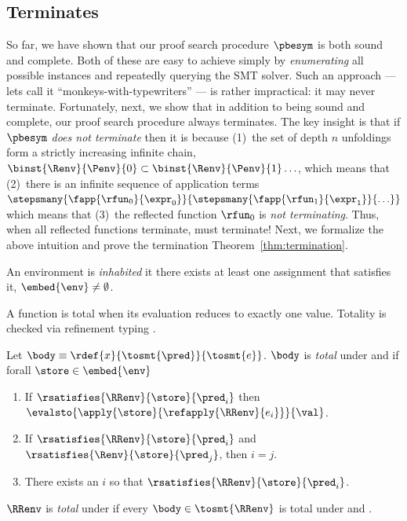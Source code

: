 \subsection{\pbesym Terminates} \label{sec:pbe:termination}

So far, we have shown that our proof search
procedure $\pbesym$ is both sound and complete.
%
Both of these are easy to achieve
simply by \emph{enumerating} all possible
instances and repeatedly querying the SMT
solver.
%
Such an approach --- lets call it
``monkeys-with-typewriters'' --- is rather
impractical: it may never terminate.
%
Fortunately, next, we show that in addition
to being sound and complete, our proof search
procedure always terminates.
%
The key insight is that if $\pbesym$ \emph{does not terminate}
then it is because
%
(1)~the set of depth $n$ unfoldings form a strictly
    increasing infinite chain,
    $\binst{\Renv}{\Penv}{0} \subset \binst{\Renv}{\Penv}{1} \ldots$,
    which means that
(2)~there is an infinite sequence of application terms
    $\stepsmany{\fapp{\rfun_0}{\expr_0}}{\stepsmany{\fapp{\rfun_1}{\expr_1}}{\ldots}}$
    which means that
(3)~the reflected function $\rfun_0$ is \emph{not terminating}.
%
Thus, when all reflected functions terminate, \pbesym must terminate!
%
Next, we formalize the above intuition and
prove the termination Theorem~\ref{thm:termination}.


%
An environment \env is \emph{inhabited} 
it there exists at least one assignment 
that satisfies it, \ie $\embed{\env} \not = \emptyset$.



%
A function is total when its evaluation 
reduces to exactly one value.
%
Totality is checked via
refinement typing \cite{Vazou14}.
%

\begin{definition}\label{asm:total}
Let $\body \equiv \rdef{x}{\tosmt{\pred}}{\tosmt{e}}$.
%
$\body$ is \emph{total} under \env and \RRenv if forall $\store\in \embed{\env}$
%
\begin{enumerate}
\item If $\rsatisfies{\RRenv}{\store}{\pred_i}$ then 
$\evalsto{{\apply{\store}{\refapply{\RRenv}{e_i}}}}{\val}$.
\item If $\rsatisfies{\RRenv}{\store}{\pred_i}$ and $\rsatisfies{\Renv}{\store}{\pred_j}$, then $i=j$.
\item There exists an $i$ so that  $\rsatisfies{\RRenv}{\store}{\pred_i}$.
\end{enumerate}
%
$\RRenv$ is \emph{total} under \env 
if every $\body \in \tosmt{\RRenv}$ is total under \env and \RRenv.
%
\end{definition}


